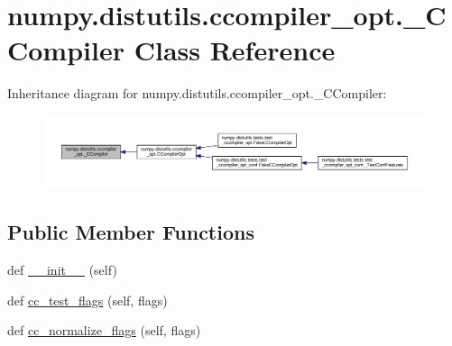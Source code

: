 \hypertarget{classnumpy_1_1distutils_1_1ccompiler__opt_1_1__CCompiler}{}\section{numpy.\+distutils.\+ccompiler\+\_\+opt.\+\_\+\+C\+Compiler Class Reference}
\label{classnumpy_1_1distutils_1_1ccompiler__opt_1_1__CCompiler}


Inheritance diagram for numpy.\+distutils.\+ccompiler\+\_\+opt.\+\_\+\+C\+Compiler\+:
\nopagebreak
\begin{figure}[H]
\begin{center}
\leavevmode
\includegraphics[width=350pt]{classnumpy_1_1distutils_1_1ccompiler__opt_1_1__CCompiler__inherit__graph}
\end{center}
\end{figure}
\subsection*{Public Member Functions}
\begin{DoxyCompactItemize}
\item 
def \hyperlink{classnumpy_1_1distutils_1_1ccompiler__opt_1_1__CCompiler_a669b398293dc9c7c0f1a731637cd7901}{\+\_\+\+\_\+init\+\_\+\+\_\+} (self)
\item 
def \hyperlink{classnumpy_1_1distutils_1_1ccompiler__opt_1_1__CCompiler_a27031cb1b233cf3d05dc4935326b8a7e}{cc\+\_\+test\+\_\+flags} (self, flags)
\item 
def \hyperlink{classnumpy_1_1distutils_1_1ccompiler__opt_1_1__CCompiler_a1b085791f381646fe6148bf32e29d3ff}{cc\+\_\+normalize\+\_\+flags} (self, flags)
\end{DoxyCompactItemize}
